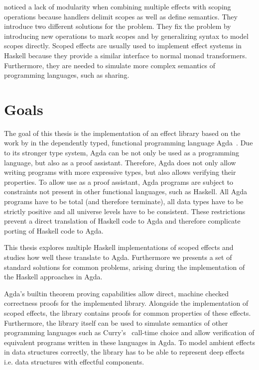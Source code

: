 \documentclass[10pt,a4paper,twoside,notitlepage]{report}
\begin{document}
\textcite{DBLP:conf/haskell/WuSH14} noticed a lack of modularity when
combining multiple effects with scoping operations because handlers delimit
scopes as well as define semantics.
They introduce two different solutions for the problem.
They fix the problem by introducing new operations to mark scopes and by
generalizing syntax to model scopes directly.
Scoped effects are usually used to implement effect systems in Haskell because
they provide a similar interface to normal monad transformers.
Furthermore, they are needed to simulate more complex semantics of programming
languages, such as sharing.


\section{Goals}

The goal of this thesis is the implementation of an effect library based on the
work by \textcite{DBLP:conf/haskell/WuSH14,DBLP:conf/lics/PirogSWJ18} in
the dependently typed, functional programming language
Agda~\cite{norell:thesis}.
Due to its stronger type system, Agda can be not only be used as a programming
language, but also as a proof assistant.
Therefore, Agda does not only allow writing programs with more expressive types,
but also allows verifying their properties.
To allow use as a proof assistant, Agda programs are subject to constraints not
present in other functional languages, such as Haskell.
All Agda programs have to be total (and therefore terminate), all data types
have to be strictly positive and all universe levels have to be consistent.
These restrictions prevent a direct translation of Haskell code to Agda and
therefore complicate porting of Haskell code to Agda.

This thesis explores multiple Haskell implementations of scoped effects and
studies how well these translate to Agda.
Furthermore we presents a set of standard solutions for common problems, arising
during the implementation of the Haskell approaches in Agda.

Agda's builtin theorem proving capabilities allow direct, machine checked
correctness proofs for the implemented library.
Alongside the implementation of scoped effects, the library contains proofs for
common properties of these effects.
Furthermore, the library itself can be used to simulate semantics of other
programming languages such as Curry's~\cite{Hanus95curry} call-time choice and
allow verification of equivalent programs written in these languages in Agda.
To model ambient effects in data structures correctly, the library has to be
able to represent deep effects i.e. data structures with effectful components.
\end{document}
